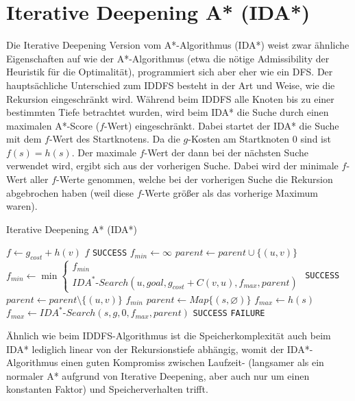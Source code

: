 \documentclass{whswinvcbook}
\begin{document}
\section{Iterative Deepening A* (IDA*)}
Die Iterative Deepening Version vom A*-Algorithmus (IDA*) weist zwar ähnliche Eigenschaften auf wie der A*-Algorithmus (etwa die nötige Admissibility der Heuristik für die Optimalität), programmiert sich aber eher wie ein DFS. Der hauptsächliche Unterschied zum IDDFS besteht in der Art und Weise, wie die Rekursion eingeschränkt wird. Während beim IDDFS alle Knoten bis zu einer bestimmten Tiefe betrachtet wurden, wird beim IDA* die Suche durch einen maximalen A*-Score ($f$-Wert) eingeschränkt. Dabei startet der IDA* die Suche mit dem $f$-Wert des Startknotens. Da die $g$-Kosten am Startknoten $0$ sind ist $f(s)=h(s)$. Der maximale $f$-Wert der dann bei der nächsten Suche verwendet wird, ergibt sich aus der vorherigen Suche. Dabei wird der minimale $f$-Wert aller $f$-Werte genommen, welche bei der vorherigen Suche die Rekursion abgebrochen haben (weil diese $f$-Werte größer als das vorherige Maximum waren).\cite{ai}
\begin{algorithm}[H]
    \caption{Iterative Deepening A* (IDA*)}\label{alg-idastar}
    \begin{algorithmic}[1]
            \State $f\gets g_{cost}+h(v)$
                \State \Return $f$
            \EndIf
                \State \Return \texttt{SUCCESS}
            \EndIf
            \State $f_{min}\gets\infty$
                    \State $parent\gets parent\cup\{(u,v)\}$
                    \State $f_{min}\gets\min\begin{cases}f_{min}\\IDA^*\text{-}Search(u,goal,g_{cost}+C(v,u),f_{max},parent)\end{cases}$
                        \State \Return \texttt{SUCCESS}
                    \EndIf
                    \State $parent\gets parent\setminus\{(u,v)\}$
                \EndIf
            \EndFor
            \State \Return $f_{min}$
        \EndFunction
            \State $parent\gets Map\{(s,\varnothing)\}$
            \State $f_{max}\gets h(s)$
                \State $f_{max}\gets IDA^*\text{-}Search(s,g,0,f_{max},parent)$
                    \State \Return \texttt{SUCCESS}
                \EndIf
            \EndWhile
            \State \Return \texttt{FAILURE}
        \EndFunction
    \end{algorithmic}
\end{algorithm}
Ähnlich wie beim IDDFS-Algorithmus ist die Speicherkomplexität auch beim IDA* lediglich linear von der Rekursionstiefe abhängig, womit der IDA*-Algorithmus einen guten Kompromiss zwischen Laufzeit- (langsamer als ein normaler A* aufgrund von Iterative Deepening, aber auch nur um einen konstanten Faktor) und Speicherverhalten trifft.
\end{document}
